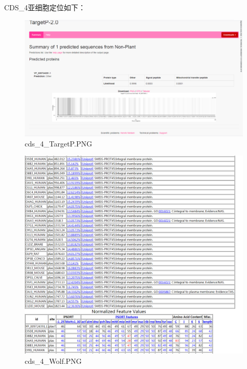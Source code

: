 \documentclass[supercite]{HustGraduPaper}
\begin{document}
	\paragraph{}\label{subpara:subpara}CDS\_4亚细胞定位如下：
	\begin{figure}[H]
		\centering
		\includegraphics[width=1\textwidth]{./material/practice2/cds_4/TargetP.png}
		\caption{cds\_4\_TargetP.PNG}
	\end{figure}
	\begin{figure}[H]
		\centering
		\includegraphics[width=1\textwidth]{./material/practice2/cds_4/wolf.png}
		\caption{cds\_4\_Wolf.PNG}
	\end{figure}
\end{document}
